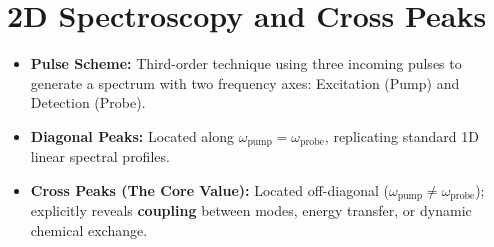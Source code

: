 \section{2D Spectroscopy and Cross Peaks}

\begin{itemize}
  \item \textbf{Pulse Scheme:} Third-order technique using three incoming pulses to generate a spectrum with two frequency axes: Excitation (Pump) and Detection (Probe).
  \item \textbf{Diagonal Peaks:} Located along $\omega_\text{pump} = \omega_\text{probe}$, replicating standard 1D linear spectral profiles.
  \item \textbf{Cross Peaks (The Core Value):} Located off-diagonal ($\omega_\text{pump}\neq \omega_\text{probe}$); explicitly reveals \textbf{coupling} between modes, energy transfer, or dynamic chemical exchange.
\end{itemize}